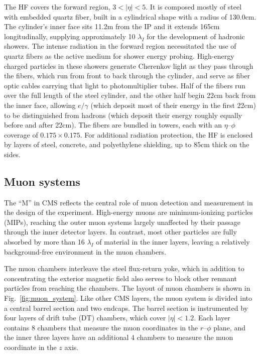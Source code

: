 The HF covers the forward region, $3 < |\eta| < 5$. It is composed mostly of steel with embedded quartz fiber, built in a cylindrical shape with a radius of 130.0\unit{cm}.
The cylinder's inner face sits 11.2\unit{m} from the IP and it extends 165\unit{cm} longitudinally, supplying approximately 10 $\lambda_{I}$ for
the development of hadronic showers. The intense radiation in the forward region necessitated the use of quartz fibers as the active medium for shower energy probing.
High-energy charged particles in these showers generate Cherenkov light as they pass through the fibers, which run from front to back through the cylinder,
and serve as fiber optic cables carrying that light to photomultiplier tubes. Half of the fibers run over the full length of the
steel cylinder, and the other half begin 22\unit{cm} back from the inner face, allowing $e/\gamma$ (which deposit most of their energy in the first 22\unit{cm}) to be
distinguished from hadrons (which deposit their energy roughly equally before and after 22\unit{cm}). The fibers are bundled in towers, each with an
$\eta$--$\phi$ coverage of $0.175{\times}0.175$. For additional radiation protection, the HF is enclosed by layers of steel, concrete, and polyethylene shielding,
up to 85\unit{cm} thick on the sides.

\subsection{Muon systems} \label{sec:LHCCMS_CMS_muon}
The ``M'' in CMS reflects the central role of muon detection and measurement in the design of the experiment.
High-energy muons are minimum-ionizing particles (MIPs), reaching the outer muon systems largely unaffected by their passage through
the inner detector layers. In contrast, most other particles are fully absorbed by more than 16 $\lambda_{I}$ of material in the inner
layers, leaving a relatively background-free environment in the muon chambers.

The muon chambers interleave the steel flux-return yoke, which in addition to concentrating the exterior magnetic field also serves
to block other remnant particles from reaching the chambers. The layout of muon chambers is shown in Fig.~\ref{fig:muon_system}.
Like other CMS layers, the muon system is divided into a central barrel section and two endcaps. The barrel section is instrumented by four
layers of drift tube (DT) chambers, which cover $|\eta| < 1.2$. Each layer contains 8 chambers that measure the muon coordinates in the $r$--$\phi$
plane, and the inner three layers have an additional 4 chambers to measure the muon coordinate in the $z$ axis.

